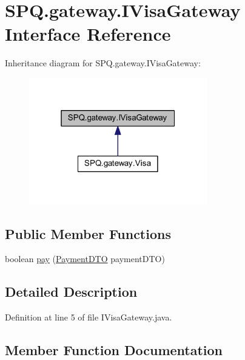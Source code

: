 \hypertarget{interface_s_p_q_1_1gateway_1_1_i_visa_gateway}{}\section{S\+P\+Q.\+gateway.\+I\+Visa\+Gateway Interface Reference}
\label{interface_s_p_q_1_1gateway_1_1_i_visa_gateway}


Inheritance diagram for S\+P\+Q.\+gateway.\+I\+Visa\+Gateway\+:
\nopagebreak
\begin{figure}[H]
\begin{center}
\leavevmode
\includegraphics[width=220pt]{interface_s_p_q_1_1gateway_1_1_i_visa_gateway__inherit__graph}
\end{center}
\end{figure}
\subsection*{Public Member Functions}
\begin{DoxyCompactItemize}
\item 
boolean \mbox{\hyperlink{interface_s_p_q_1_1gateway_1_1_i_visa_gateway_adb8feee5084ca3e28c61360719a24c7a}{pay}} (\mbox{\hyperlink{class_s_p_q_1_1dto_1_1_payment_d_t_o}{Payment\+D\+TO}} payment\+D\+TO)
\end{DoxyCompactItemize}


\subsection{Detailed Description}


Definition at line 5 of file I\+Visa\+Gateway.\+java.



\subsection{Member Function Documentation}
\mbox{\label{interface_s_p_q_1_1gateway_1_1_i_visa_gateway_adb8feee5084ca3e28c61360719a24c7a}} 
